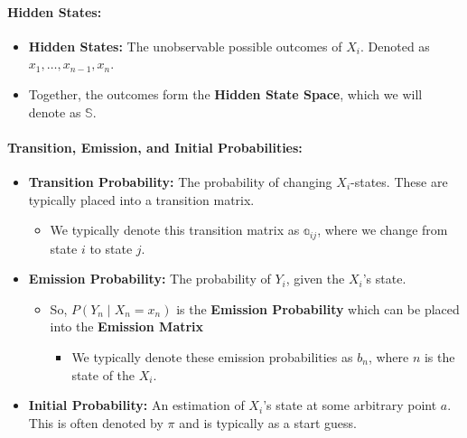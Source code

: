 \documentclass[
]{book}
\providecommand{\tightlist}{%
  \setlength{\itemsep}{0pt}\setlength{\parskip}{0pt}}
\begin{document}
\hypertarget{hidden-states}{%
\paragraph*{Hidden States:}\label{hidden-states}}

\begin{itemize}
\tightlist
\item
  \textbf{Hidden States:} The unobservable possible outcomes of \(X_i\). Denoted as \(x_1, \dots, x_{n-1}, x_{n}\).
\item
  Together, the outcomes form the \textbf{Hidden State Space}, which we will denote as \(\mathbb{S}\).
\end{itemize}

\hypertarget{transition-emission-and-initial-probabilities}{%
\paragraph*{Transition, Emission, and Initial Probabilities:}\label{transition-emission-and-initial-probabilities}}

\begin{itemize}
\tightlist
\item
  \textbf{Transition Probability:} The probability of changing \(X_i\)-states. These are typically placed into a transition matrix.

  \begin{itemize}
  \tightlist
  \item
    We typically denote this transition matrix as \(\mathbb{a}_{ij}\), where we change from state \(i\) to state \(j\).
  \end{itemize}
\item
  \textbf{Emission Probability:} The probability of \(Y_i\), given the \(X_i\)'s state.

  \begin{itemize}
  \tightlist
  \item
    So, \(P(Y_{n}\mid X_{n} = x_{n})\) is the \textbf{Emission Probability} which can be placed into the \textbf{Emission Matrix}

    \begin{itemize}
    \tightlist
    \item
      We typically denote these emission probabilities as \(b_n\), where \(n\) is the state of the \(X_i\).
    \end{itemize}
  \end{itemize}
\item
  \textbf{Initial Probability:} An estimation of \(X_i\)'s state at some arbitrary point \(a\). This is often denoted by \(\pi\) and is typically as a start guess.
\end{itemize}
\end{document}
